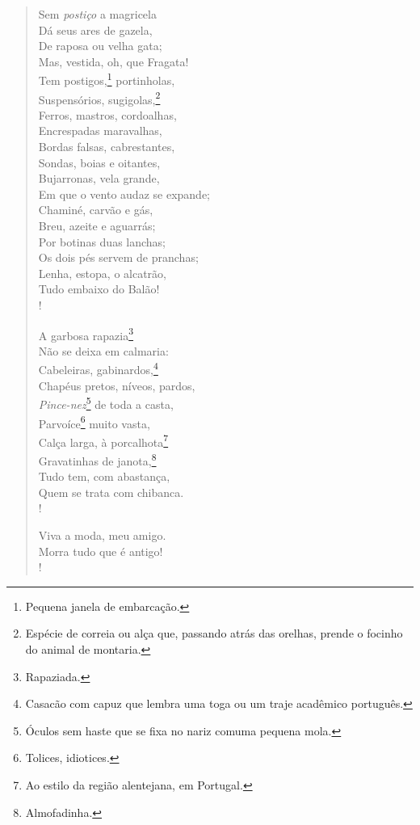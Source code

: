\begin{verse}
Sem \emph{postiço} a magricela\\
Dá seus ares de gazela,\\
De raposa ou velha gata;\\
Mas, vestida, oh, que Fragata!\\
Tem postigos,\footnote{ Pequena janela de embarcação.} portinholas,\\
Suspensórios, sugigolas,\footnote{ Espécie de correia ou alça que, 
                                  passando atrás das orelhas, prende 
                                  o focinho do animal de montaria.}\\
Ferros, mastros, cordoalhas,\\
Encrespadas maravalhas,\\
Bordas falsas, cabrestantes,\\
Sondas, boias e oitantes,\\
Bujarronas, vela grande,\\
Em que o vento audaz se expande;\\
Chaminé, carvão e gás,\\
Breu, azeite e aguarrás;\\
Por botinas duas lanchas;\\
Os dois pés servem de pranchas;\\
Lenha, estopa, o alcatrão,\\
Tudo embaixo do Balão!\\!

A garbosa rapazia\footnote{ Rapaziada.}\\
Não se deixa em calmaria:\\
Cabeleiras, gabinardos,\footnote{ Casacão com capuz que lembra uma toga ou um traje acadêmico português.}\\
Chapéus pretos, níveos, pardos,\\
\emph{Pince-nez}\footnote{ Óculos sem haste que se fixa no nariz comuma pequena mola.} de toda a casta,\\
Parvoíce\footnote{ Tolices, idiotices.} muito vasta,\\
Calça larga, à porcalhota\footnote{ Ao estilo da região alentejana, em Portugal.}\\
Gravatinhas de janota,\footnote{ Almofadinha.}\\
Tudo tem, com abastança,\\
Quem se trata com chibanca.\\!

Viva a moda, meu amigo.\\
Morra tudo que é antigo!\\!


\end{verse}
